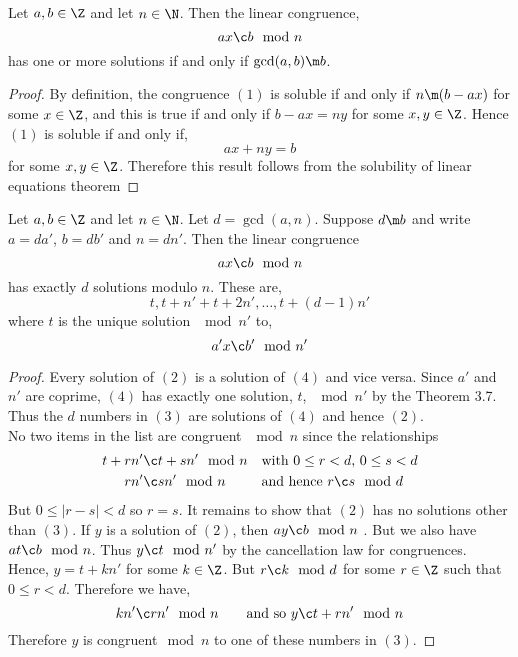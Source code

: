 \begin{nthm}
  Let $a, b \in \Z$ and let $n \in \N$. Then the linear congruence,
  \begin{equation}
    ax \c b \mod n
  \end{equation}
  has one or more solutions if and only if $\gcd (a, b) \m b$.
\end{nthm}
\begin{proof}
  By definition, the congruence $(1)$ is soluble if and only if $n \m (b - ax)$ for some $x \in \Z$, and this is true if and only if $b - ax = ny$ for some $x, y \in \Z$. Hence $(1)$ is soluble if and only if,
  $$ ax + ny =b $$
  for some $x, y \in \Z$. Therefore this result follows from the solubility of linear equations theorem
\end{proof}

\begin{nthm}[]
  Let $a, b \in \Z$ and let $n \in \N$. Let $d = \gcd (a, n)$. Suppose $d \m b$ and write $a = da'$, $b = db'$ and $n = dn'$. Then the linear congruence
  \begin{equation}
    ax \c b \mod n
  \end{equation}
  has exactly $d$ solutions modulo $n$. These are,
  \begin{equation}
     t, t +n' + t+ 2n', \dots, t + (d-1)n'
  \end{equation}
  where $t$ is the unique solution $\mod n'$ to,
  \begin{equation}
    a'x \c b' \mod n'
  \end{equation}
\end{nthm}
\begin{proof}
  Every solution of $(2)$ is a solution of $(4)$ and vice versa. Since $a'$ and $n'$ are coprime, $(4)$ has exactly one solution, $t$, $\mod n'$  by the Theorem 3.7. Thus the $d$ numbers in $(3)$ are solutions of $(4)$ and hence $(2)$.\\

  \noindent
  No two items in the list are congruent $\mod n$ since the relationships
  \begin{align*}
    t + rn' &\c t + sn' \mod n && \text{with $0 \le r < d$, $0 \le s < d$}\\
    rn' &\c sn' \mod n && \text{and hence $r \c s \mod d$}
  \end{align*}
  But $0 \le |r - s| < d$ so $r = s$. It remains to show that $(2)$ has no solutions other than $(3)$. If $y$ is a solution of $(2)$, then $ay \c b \mod n$
. But we also have $at \c b \mod n$. Thus $y \c t \mod n'$
  by the cancellation law for congruences. Hence, $y = t + kn'$ for some $k \in \Z$. But $r \c k \mod d$ for some $r \in \Z$ such that $0 \le r < d$. Therefore we have,
  $$ kn' \c rn' \mod n \qquad \text{and so $y \c t + rn' \mod n$} $$
  Therefore $y$ is congruent$\mod n$ to one of these numbers in $(3)$.
\end{proof}

